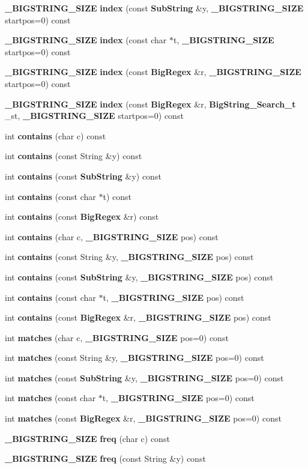 \begin{CompactItemize}
\item 
{\bf \_\-BIGSTRING\_\-SIZE} {\bf index} (const {\bf Sub\-String} \&y, {\bf \_\-BIGSTRING\_\-SIZE} startpos=0) const
\item 
{\bf \_\-BIGSTRING\_\-SIZE} {\bf index} (const char $\ast$t, {\bf \_\-BIGSTRING\_\-SIZE} startpos=0) const
\item 
{\bf \_\-BIGSTRING\_\-SIZE} {\bf index} (const {\bf Big\-Regex} \&r, {\bf \_\-BIGSTRING\_\-SIZE} startpos=0) const
\item 
{\bf \_\-BIGSTRING\_\-SIZE} {\bf index} (const {\bf Big\-Regex} \&r, {\bf Big\-String\_\-Search\_\-t} \_\-st, {\bf \_\-BIGSTRING\_\-SIZE} startpos=0) const
\item 
int {\bf contains} (char c) const
\item 
int {\bf contains} (const String \&y) const
\item 
int {\bf contains} (const {\bf Sub\-String} \&y) const
\item 
int {\bf contains} (const char $\ast$t) const
\item 
int {\bf contains} (const {\bf Big\-Regex} \&r) const
\item 
int {\bf contains} (char c, {\bf \_\-BIGSTRING\_\-SIZE} pos) const
\item 
int {\bf contains} (const String \&y, {\bf \_\-BIGSTRING\_\-SIZE} pos) const
\item 
int {\bf contains} (const {\bf Sub\-String} \&y, {\bf \_\-BIGSTRING\_\-SIZE} pos) const
\item 
int {\bf contains} (const char $\ast$t, {\bf \_\-BIGSTRING\_\-SIZE} pos) const
\item 
int {\bf contains} (const {\bf Big\-Regex} \&r, {\bf \_\-BIGSTRING\_\-SIZE} pos) const
\item 
int {\bf matches} (char c, {\bf \_\-BIGSTRING\_\-SIZE} pos=0) const
\item 
int {\bf matches} (const String \&y, {\bf \_\-BIGSTRING\_\-SIZE} pos=0) const
\item 
int {\bf matches} (const {\bf Sub\-String} \&y, {\bf \_\-BIGSTRING\_\-SIZE} pos=0) const
\item 
int {\bf matches} (const char $\ast$t, {\bf \_\-BIGSTRING\_\-SIZE} pos=0) const
\item 
int {\bf matches} (const {\bf Big\-Regex} \&r, {\bf \_\-BIGSTRING\_\-SIZE} pos=0) const
\item 
{\bf \_\-BIGSTRING\_\-SIZE} {\bf freq} (char c) const
\item 
{\bf \_\-BIGSTRING\_\-SIZE} {\bf freq} (const String \&y) const

\end{CompactItemize}
